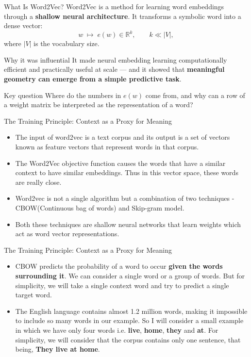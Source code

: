 \documentclass[11pt,aspectratio=169,professionalfonts]{beamer}
\begin{document}
\begin{frame}{What Is Word2Vec?}
Word2Vec is a method for learning word embeddings through a \textbf{shallow neural architecture}.
It transforms a symbolic word into a dense vector:
\[
w \;\mapsto\; e(w) \in \mathbb{R}^{k}, \qquad k \ll |V|,
\]
where $|V|$ is the vocabulary size.

\vspace{0.15cm}
\begin{block}{Why it was influential}
It made neural embedding learning computationally efficient and practically useful at scale --- and it showed that \textbf{meaningful geometry can emerge from a simple predictive task}.
\end{block}

\vspace{0.1cm}
\begin{alertblock}{Key question}
Where do the numbers in $e(w)$ come from, and why can a row of a weight matrix be interpreted as the representation of a word?
\end{alertblock}
\end{frame}
%
%
\begin{frame}{The Training Principle: Context as a Proxy for Meaning}
	\begin{itemize}
		\item The input of word2vec is a text corpus and its output is a set of vectors known as feature vectors that represent words in that corpus. 
	\item The Word2Vec objective function causes the words that have a similar context to have similar embeddings. Thus in this vector space, these words are really close. 
		\item Word2vec is not a single algorithm but a combination of two techniques - CBOW(Continuous bag of words) and Skip-gram model.
		\item Both these techniques are shallow neural networks that learn weights which act as word vector representations. 
	\end{itemize}
\end{frame}
%
%
\begin{frame}{The Training Principle: Context as a Proxy for Meaning}
	\begin{itemize}
		\item CBOW predicts the probability of a word to occur \textbf{given the words surrounding it}. We can consider a single word or a group of words. But for simplicity, we will take a single context word and try to predict a single target word.
		\item The English language contains almost 1.2 million words, making it impossible to include so many words in our example. So I will consider a small example in which we have only four words i.e. \textbf{live}, \textbf{home}, \textbf{they} and \textbf{at}. For simplicity, we will consider that the corpus contains only one sentence, that being, \textbf{They live at home}.
	\end{itemize}
\end{frame}
\end{document}

